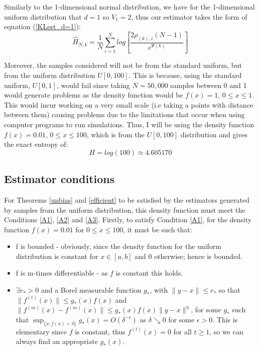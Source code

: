 \documentclass[12pt]{report}
\begin{document}
Similarly to the 1-dimensional normal distribution, we have for the 1-dimensional uniform distribution that $d=1$ so $V_{1} = 2$, thus our estimator takes the form of equation (\ref{KLest_d=1}):
\begin{equation}
\hat{H}_{N, k} =  \frac{1}{N} \sum_{i=1}^{N} log \left[ \frac{2\rho_{(k),i}(N-1)}{e^{\Psi(k)}} \right]\nonumber
\end{equation}

Moreover, the samples considered will not be from the standard uniform, but from the uniform distribution $U[0,100]$. This is because, using the standard uniform, $U[0,1]$, would fail since taking $N=50,000$ samples between 0 and 1 would generate problems as the density function would be $f(x) = 1$, $0 \leq x \leq 1$. This would incur working on a very small scale (i.e taking a points with distance between them) causing problems due to the limitations that occur when using computer programs to run simulations. Thus, I will be using the density function $f(x) = 0.01$, $0 \leq x \leq 100$, which is from the $U[0,100]$ distribution and gives the exact entropy of:
\begin{equation} \label{uniform_exact}
H = log(100) \approx 4.605170
\end{equation}




\subsection{Estimator conditions} \label{U_Conditions}

For Theorems \ref{unbias} and \ref{efficient} to be satisfied by the estimators generated by samples from the uniform distribution, this density function must meet the Conditions \ref{A1}, \ref{A2} and \ref{A3}. 
Firstly, to satisfy Condition \ref{A1}, for the density function $f(x) = 0.01$ for $0 \leq x \leq 100$, it must be such that:
\begin{itemize}
\item f is bounded - obviously, since the density function for the uniform distribution is constant for $x \in [a, b]$ and $0$ otherwise; hence is bounded.

\item f is m-times differentiable - as $f$ is constant this holds.

\item $\exists r_{*} > 0$ and a Borel measurable function $g_{*}$, with $\|y-x\| \leq r_{*}$ so that $\|f^{(t)}(x)\| \leq g_{*}(x) f(x)$ and $\|f^{(m)}(x) - f^{(m)}(x)\| \leq g_{*}(x) f(x)\|y - x\|^{\eta}$, for some $g_{*}$ such that $\sup_{\{x : f(x) < \delta\}} g_{*}(x) = O(\delta^{-\epsilon})$ as $\delta \searrow 0$ for some $\epsilon >0$.
This is elementary since $f$ is constant, thus $f^{(t)}(x) = 0$ for all $t \geq 1$, so we can always find an appropriate $g_{*}(x)$.

\end{itemize}
\end{document}
